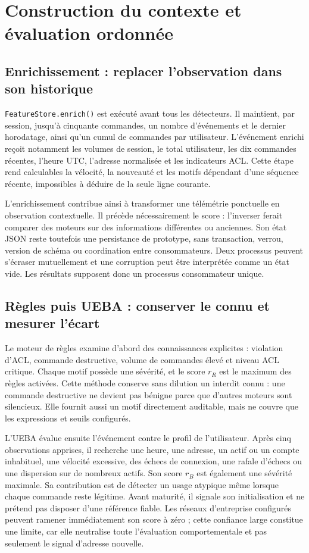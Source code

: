 \documentclass[11pt,a4paper,oneside]{report}
\theoremstyle{definition}
\theoremstyle{plain}
\begin{document}
\section{Construction du contexte et évaluation ordonnée}

\subsection{Enrichissement : replacer l'observation dans son historique}

\texttt{FeatureStore.enrich()} est exécuté avant tous les détecteurs. Il
maintient, par session, jusqu'à cinquante commandes, un nombre d'événements et
le dernier horodatage, ainsi qu'un cumul de commandes par utilisateur.
L'événement enrichi reçoit notamment les volumes de session, le total
utilisateur, les dix commandes récentes, l'heure UTC, l'adresse normalisée et
les indicateurs ACL. Cette étape rend calculables la vélocité, la nouveauté et
les motifs dépendant d'une séquence récente, impossibles à déduire de la seule
ligne courante.

L'enrichissement contribue ainsi à transformer une télémétrie ponctuelle en
observation contextuelle. Il précède nécessairement le score : l'inverser
ferait comparer des moteurs sur des informations différentes ou anciennes.
Son état JSON reste toutefois une persistance de prototype, sans transaction,
verrou, version de schéma ou coordination entre consommateurs. Deux processus
peuvent s'écraser mutuellement et une corruption peut être interprétée comme
un état vide. Les résultats supposent donc un processus consommateur unique.

\subsection{Règles puis UEBA : conserver le connu et mesurer l'écart}

Le moteur de règles examine d'abord des connaissances explicites : violation
d'ACL, commande destructive, volume de commandes élevé et niveau ACL
critique. Chaque motif possède une sévérité, et le score \(r_R\) est le maximum
des règles activées. Cette méthode conserve sans dilution un interdit connu :
une commande destructive ne devient pas bénigne parce que d'autres moteurs
sont silencieux. Elle fournit aussi un motif directement auditable, mais ne
couvre que les expressions et seuils configurés.

L'UEBA évalue ensuite l'événement contre le profil de l'utilisateur. Après
cinq observations apprises, il recherche une heure, une adresse, un actif ou
un compte inhabituel, une vélocité excessive, des échecs de connexion, une
rafale d'échecs ou une dispersion sur de nombreux actifs. Son score \(r_B\)
est également une sévérité maximale. Sa contribution est de détecter un usage
atypique même lorsque chaque commande reste légitime. Avant maturité, il
signale son initialisation et ne prétend pas disposer d'une référence fiable.
Les réseaux d'entreprise configurés peuvent ramener immédiatement son score à
zéro ; cette confiance large constitue une limite, car elle neutralise toute
l'évaluation comportementale et pas seulement le signal d'adresse nouvelle.
\end{document}
